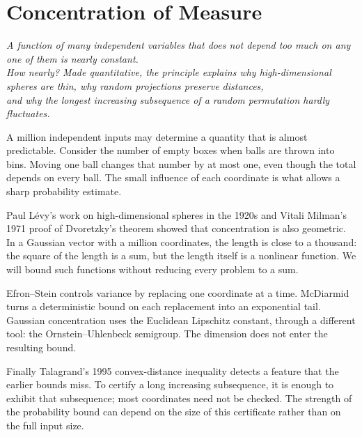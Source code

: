 \chapter{Concentration of Measure}
\begin{center}\itshape
A function of many independent variables that does not depend too much on any one of them is nearly constant.\\
How nearly? Made quantitative, the principle explains why high-dimensional spheres are thin, why random projections preserve distances,\\
and why the longest increasing subsequence of a random permutation hardly fluctuates.
\end{center}

A million independent inputs may determine a quantity that is almost predictable. Consider the number of empty boxes when balls are thrown into bins. Moving one ball changes that number by at most one, even though the total depends on every ball. The small influence of each coordinate is what allows a sharp probability estimate.

Paul L\'evy's work on high-dimensional spheres in the 1920s and Vitali Milman's 1971 proof of Dvoretzky's theorem showed that concentration is also geometric. In a Gaussian vector with a million coordinates, the length is close to a thousand: the square of the length is a sum, but the length itself is a nonlinear function. We will bound such functions without reducing every problem to a sum.

Efron--Stein controls variance by replacing one coordinate at a time. McDiarmid turns a deterministic bound on each replacement into an exponential tail. Gaussian concentration uses the Euclidean Lipschitz constant, through a different tool: the Ornstein--Uhlenbeck semigroup. The dimension does not enter the resulting bound.

Finally Talagrand's 1995 convex-distance inequality detects a feature that the earlier bounds miss. To certify a long increasing subsequence, it is enough to exhibit that subsequence; most coordinates need not be checked. The strength of the probability bound can depend on the size of this certificate rather than on the full input size.

